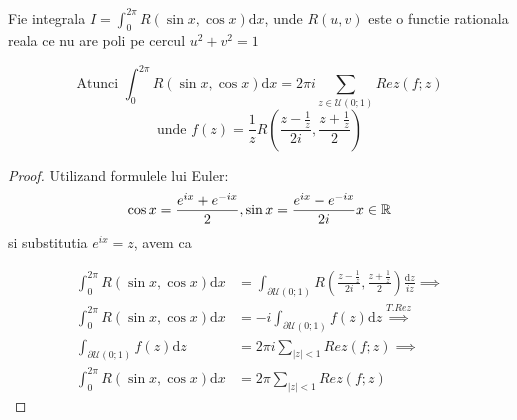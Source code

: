 \begin{tip}[1]
    Fie integrala $\displaystyle I=\int_{0}^{2\pi} R(\sin x, \cos x) \mathrm{d} x$, unde
    $R(u,v)$ este o functie rationala reala ce nu are poli pe cercul $u^2+v^2=1$

	\[
        \text{Atunci } \int_{0}^{2\pi} R(\sin x , \cos x) \mathrm{d} x =
        2\pi i \sum_{z\in \mathcal{U}(0;1)} Rez(f;z)
    \]
    \[
        \text{unde } f(z) = \frac{1}{z} R\left(\frac{z-\frac{1}{z}}{2i}, \frac{z+\frac{1}{z}}{2} \right)
    \]

    \begin{proof}
        Utilizand formulele lui Euler:
        \[
            \cos x = \frac{e^{ix}+e^{-ix}}{2}, \sin x = \frac{e^{ix}-e^{-ix}}{2i} x \in \mathbb{R}
        \]
        si substitutia $e^{ix}=z$, avem ca

        \begin{align*}
            \int_{0}^{2\pi} R(\sin x , \cos x) \mathrm{d} x &=
                \int_{\partial \mathcal{U}(0;1)}
                    R\left(\frac{z-\frac{1}{z}}{2i}, \frac{z+\frac{1}{z}}{2} \right)
                \frac{\mathrm{d} z}{iz}
            \implies
						\\
						\int_{0}^{2\pi} R(\sin x , \cos x) \mathrm{d} x
							&= -i \int_{\partial \mathcal{U}(0;1)} f(z) \mathrm{d}z
            \overset{T.Rez}{\implies}
						\\
						\int_{\partial \mathcal{U}(0;1)} f(z) \mathrm{d}z &=
                2\pi i \sum_{|z|<1} Rez(f;z)
            \implies
						\\
						\int_{0}^{2\pi} R(\sin x , \cos x) \mathrm{d} x &=
                2\pi \sum_{|z|<1} Rez(f;z)
        \end{align*}


    \end{proof}
\end{tip}


